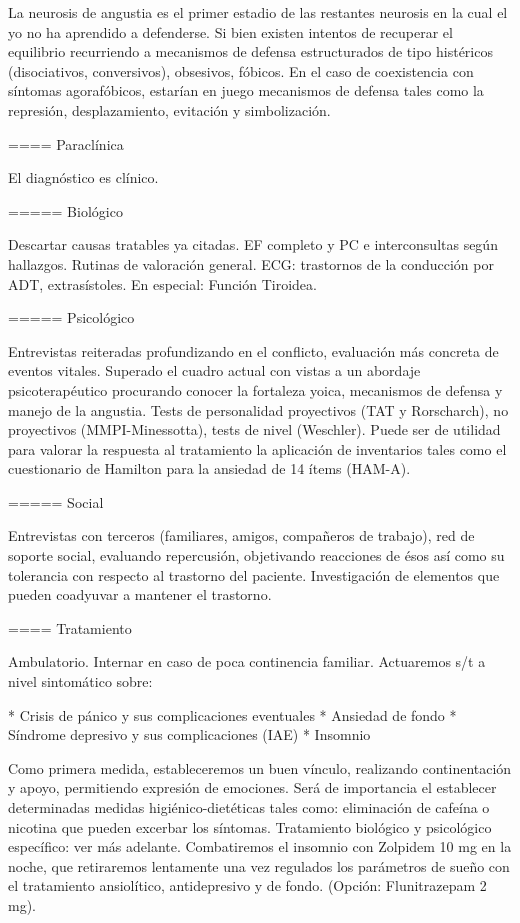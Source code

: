 \documentclass{scrbook}
\begin{document}
La neurosis de angustia es el primer estadio de las restantes neurosis en la cual el yo no ha aprendido a defenderse. Si bien existen intentos de recuperar el equilibrio recurriendo a mecanismos de defensa estructurados de tipo histéricos (disociativos, conversivos), obsesivos, fóbicos. En el caso de coexistencia con síntomas agorafóbicos, estarían en juego mecanismos de defensa tales como la represión, desplazamiento, evitación y simbolización.

==== Paraclínica

El diagnóstico es clínico.

===== Biológico

Descartar causas tratables ya citadas. EF completo y PC e interconsultas según hallazgos. Rutinas de valoración general. ECG: trastornos de la conducción por ADT, extrasístoles. En especial: Función Tiroidea.

===== Psicológico

Entrevistas reiteradas profundizando en el conflicto, evaluación más concreta de eventos vitales. Superado el cuadro actual con vistas a un abordaje psicoterapéutico procurando conocer la fortaleza yoica, mecanismos de defensa y manejo de la angustia. Tests de personalidad proyectivos (TAT y Rorscharch), no proyectivos (MMPI-Minessotta), tests de nivel (Weschler). Puede ser de utilidad para valorar la respuesta al tratamiento la aplicación de inventarios tales como el cuestionario de Hamilton para la ansiedad de 14 ítems (HAM-A).

===== Social

Entrevistas con terceros (familiares, amigos, compañeros de trabajo), red de soporte social, evaluando repercusión, objetivando reacciones de ésos así como su tolerancia con respecto al trastorno del paciente. Investigación de elementos que pueden coadyuvar a mantener el trastorno.

==== Tratamiento

Ambulatorio. Internar en caso de poca continencia familiar. Actuaremos s/t a nivel sintomático sobre:

* Crisis de pánico y sus complicaciones eventuales
* Ansiedad de fondo
* Síndrome depresivo y sus complicaciones (IAE)
* Insomnio

Como primera medida, estableceremos un buen vínculo, realizando continentación y apoyo, permitiendo expresión de emociones. Será de importancia el establecer determinadas medidas higiénico-dietéticas tales como: eliminación de cafeína o nicotina que pueden excerbar los síntomas. Tratamiento biológico y psicológico específico: ver más adelante. Combatiremos el insomnio con Zolpidem 10 mg en la noche, que retiraremos lentamente una vez regulados los parámetros de sueño con el tratamiento ansiolítico, antidepresivo y de fondo. (Opción: Flunitrazepam 2 mg).
\end{document}
